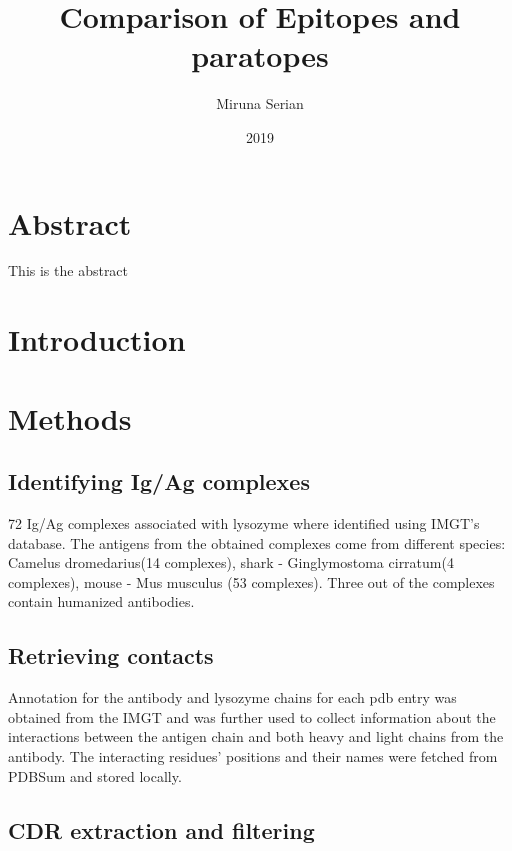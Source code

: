 \documentclass{article}
\begin{document}
\title{Comparison of Epitopes and paratopes}

\author{Miruna Serian}
\date{2019}
\maketitle
\newpage 

\section*{Abstract}
\markright{}
This is the abstract
\section{Introduction}
\markright{}
\newpage 
\section{Methods}
\subsection{Identifying Ig/Ag complexes}
 72 Ig/Ag complexes associated with lysozyme where identified using IMGT's database. The antigens from the obtained complexes come from different species: Camelus dromedarius(14 complexes), shark - Ginglymostoma cirratum(4 complexes), mouse - Mus musculus (53 complexes). Three out of the complexes contain humanized antibodies.
 
\subsection{Retrieving contacts}
Annotation for the antibody and lysozyme chains for each pdb entry was obtained from the IMGT and was further used to collect information about the interactions between the antigen chain and both heavy and light chains from the antibody. The interacting residues' positions and their names were fetched from PDBSum and stored locally.

\subsection{CDR extraction and filtering}
\end{document}
